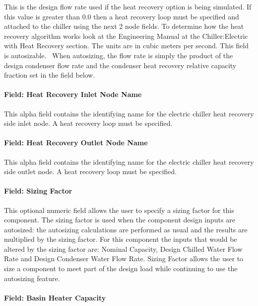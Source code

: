 This is the design flow rate used if the heat recovery option is being simulated. If this value is greater than 0.0 then a heat recovery loop must be specified and attached to the chiller using the next 2 node fields. To determine how the heat recovery algorithm works look at the Engineering Manual at the Chiller:Electric with Heat Recovery section. The units are in cubic meters per second. This field is autosizable.~ When autosizing, the flow rate is simply the product of the design condenser flow rate and the condenser heat recovery relative capacity fraction set in the field below.

\paragraph{Field: Heat Recovery Inlet Node Name}\label{field-heat-recovery-inlet-node-name-000}

This alpha field contains the identifying name for the electric chiller heat recovery side inlet node. A heat recovery loop must be specified.

\paragraph{Field: Heat Recovery Outlet Node Name}\label{field-heat-recovery-outlet-node-name-000}

This alpha field contains the identifying name for the electric chiller heat recovery side outlet node. A heat recovery loop must be specified.

\paragraph{Field: Sizing Factor}\label{field-sizing-factor-3-000}

This optional numeric field allows the user to specify a sizing factor for this component. The sizing factor is used when the component design inputs are autosized: the autosizing calculations are performed as usual and the results are multiplied by the sizing factor. For this component the inputs that would be altered by the sizing factor are: Nominal Capacity, Design Chilled Water Flow Rate and Design Condenser Water Flow Rate. Sizing Factor allows the user to size a component to meet part of the design load while continuing to use the autosizing feature.

\paragraph{Field: Basin Heater Capacity}\label{field-basin-heater-capacity-1-001}

